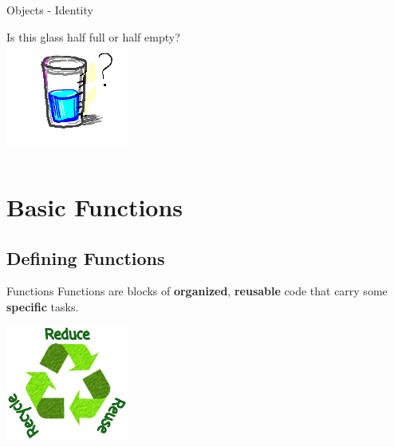     \begin{frame}{Objects - Identity}
        \begin{center}
            \Large
            Is this glass half full or half empty?
            \\
            \includegraphics[width=0.30\textwidth]{Lecture2/images/glass.png}
            \pause
            \inputminted[frame=single,framesep=2pt, firstline=6]{python3}{code-examples/identity.py}
            \pause
        \end{center}
    \end{frame}
    
    \section{Basic Functions}
        \subsection{Defining Functions}
        \begin{frame}[c]{Functions}
            \LARGE
            Functions are blocks of 
            \pause
            \textbf{organized}, 
            \pause
            \textbf{reusable} code 
            \pause that carry some \textbf{specific} tasks.\\
            \pause
            \begin{center}
                \includegraphics[width=0.3\textwidth]{Lecture2/images/reduce_reuse_recycle.png}
            \end{center}
        \end{frame}   
        
